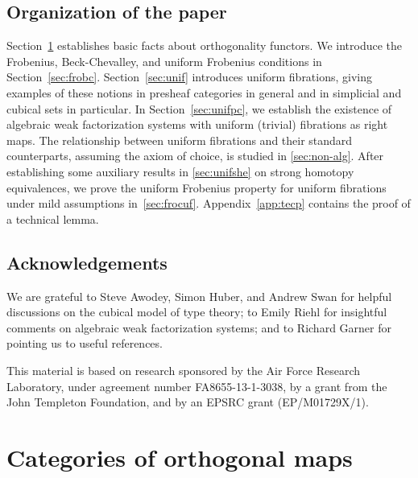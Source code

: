 \documentclass[reqno,10pt,a4paper,oneside,draft]{amsart}
\begin{document}
\subsection*{Organization of the paper}
Section~\ref{sec:ortf} establishes basic facts about orthogonality functors. 
We introduce the Frobenius, Beck-Chevalley, and uniform Frobenius conditions in Section~\ref{sec:frobc}. Section~\ref{sec:unif} introduces uniform fibrations, giving examples of these notions in presheaf categories in general and in simplicial and cubical sets in particular.
In Section~\ref{sec:unifpc}, we establish the existence of algebraic weak factorization systems with uniform (trivial) fibrations as right maps.
The relationship between uniform fibrations and their standard counterparts, assuming the axiom of choice, is studied in \cref{sec:non-alg}.
After establishing some auxiliary results in \cref{sec:unifshe} on strong homotopy equivalences, we prove the uniform Frobenius property for 
uniform fibrations under mild assumptions in~\cref{sec:frocuf}.
Appendix~\ref{app:tecp} contains the proof of a technical lemma.

\subsection*{Acknowledgements}
We are grateful to Steve Awodey, Simon Huber, and Andrew Swan for helpful discussions on the cubical model of type theory; to Emily Riehl for insightful comments on algebraic weak factorization systems; and to Richard Garner for pointing us to useful references.

This material is based on research sponsored by the Air Force Research Laboratory, under agreement number FA8655-13-1-3038, by a grant from the John Templeton Foundation, and by an EPSRC grant (EP/M01729X/1).





\section{Categories of orthogonal maps}
\label{sec:ortf}
\end{document}
